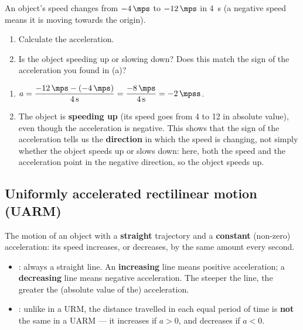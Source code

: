 \begin{exercise}
    An object's speed changes from \(\qty{-4}{\mps}\) to \(\qty{-12}{\mps}\) in \qty{4}{\s} (a negative speed means it is moving towards the origin).
    \begin{enumerate}[label=\letraminuscula]
        \item Calculate the acceleration.
        \item Is the object speeding up or slowing down? Does this match the sign of the acceleration you found in (a)?
    \end{enumerate}
    \begin{solu}
        \begin{enumerate}[label=\alph*)]
            \item \(a = \dfrac{\qty{-12}{\mps} - (\qty{-4}{\mps})}{\qty{4}{\s}} = \dfrac{\qty{-8}{\mps}}{\qty{4}{\s}} = \qty{-2}{\mpss}\).
            \item The object is \textbf{speeding up} (its speed goes from \qty{4}{\mps} to \qty{12}{\mps} in absolute value), even though the acceleration is negative. This shows that the sign of the acceleration tells us the \textbf{direction} in which the speed is changing, not simply whether the object speeds up or slows down: here, both the speed and the acceleration point in the negative direction, so the object speeds up.
        \end{enumerate}
    \end{solu}
\end{exercise}

\subsection{Uniformly accelerated rectilinear motion (UARM)}

\begin{definition}[UARM]
    The motion of an object with a \textbf{straight} trajectory and a \textbf{constant} (non-zero) acceleration: its speed increases, or decreases, by the same amount every second.
\end{definition}

\begin{itemize}
    \item {}: always a straight line. An \textbf{increasing} line means positive acceleration; a \textbf{decreasing} line means negative acceleration. The steeper the line, the greater the (absolute value of the) acceleration.
    \item {}: unlike in a URM, the distance travelled in each equal period of time is \textbf{not} the same in a UARM — it increases if \(a>0\), and decreases if \(a<0\).
\end{itemize}

